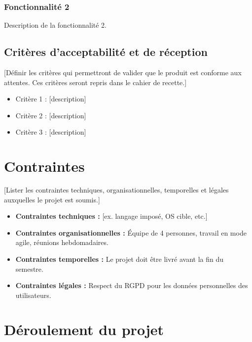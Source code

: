 \documentclass[12pt, a4paper]{article}
\begin{document}
\subsubsection{Fonctionnalité 2}

Description de la fonctionnalité 2.

\subsection{Critères d'acceptabilité et de réception}

[Définir les critères qui permettront de valider que le produit est conforme
aux attentes. Ces critères seront repris dans le cahier de recette.]

\begin{itemize}
  \item Critère 1 : [description]
  \item Critère 2 : [description]
  \item Critère 3 : [description]
\end{itemize}

\section{Contraintes}

[Lister les contraintes techniques, organisationnelles, temporelles et légales
auxquelles le projet est soumis.]

\begin{itemize}
  \item \textbf{Contraintes techniques :} [ex. langage imposé, OS cible, etc.]
  \item \textbf{Contraintes organisationnelles :} Équipe de 4 personnes, travail
    en mode agile, réunions hebdomadaires.
  \item \textbf{Contraintes temporelles :} Le projet doit être livré avant la
    fin du semestre.
  \item \textbf{Contraintes légales :} Respect du RGPD pour les données
    personnelles des utilisateurs.
\end{itemize}

\section{Déroulement du projet}
\end{document}
